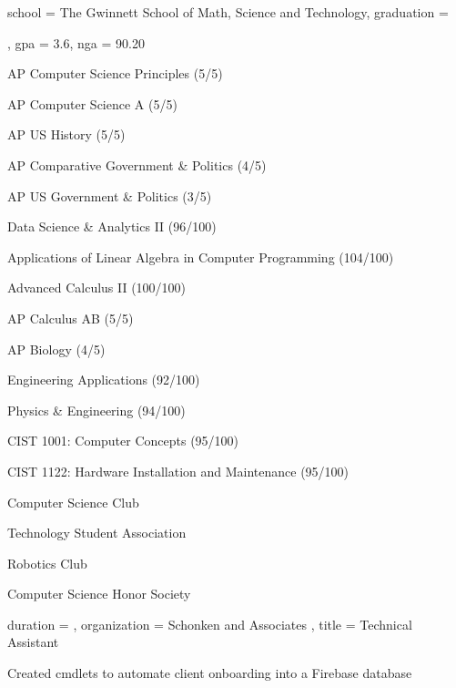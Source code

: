 \documentclass[sidebar-width=2.25in, primary=slate]{clean-resume}
\begin{document}
  \begin{main}
    
    \education
    {
      school = {The Gwinnett School of Math, Science and Technology},
      graduation = {\date{2024/5}},
      gpa = 3.6,
      nga = 90.20
    }
  
    \begin{lst}
      [
        title = {Relevant Coursework},
        columns = 2,
    	]
      \item AP Computer Science Principles (5/5)
      \item AP Computer Science A (5/5)
      \item AP US History (5/5)
      \item AP Comparative Government \& Politics (4/5)
      \item AP US Government \& Politics (3/5)
      \item Data Science \& Analytics II (96/100)
      \item Applications of Linear Algebra in Computer Programming (104/100)
      \item Advanced Calculus II (100/100)
      \item AP Calculus AB (5/5)
      \item AP Biology (4/5)
      \item Engineering Applications (92/100)
      \item Physics \& Engineering (94/100)
      \item CIST 1001: Computer Concepts (95/100)
      \item CIST 1122: Hardware Installation and Maintenance (95/100)
    \end{lst}
    
    \begin{lst}
      [
        title = Clubs,
        columns = 2,
  	]
      \item Computer Science Club
      \item Technology Student Association
      \item Robotics Club
      \item Computer Science Honor Society
    \end{lst}
    
    
    \begin{experience}
      {
        duration = {  },
        organization = { Schonken and Associates },
        title = { Technical Assistant }
      }
      \item Created cmdlets to automate client onboarding into a Firebase database
    \end{experience}
    

\end{main}
\end{document}
